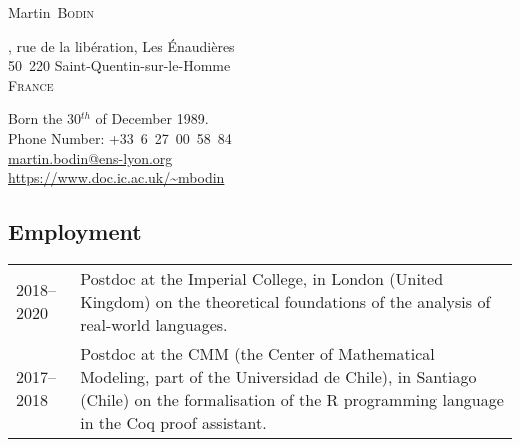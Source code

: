 \documentclass[12pt,a4paper]{article}
\makeatletter
\newcommand{\es}[1]{\foreignlanguage{spanish}{{#1}}}
\newcommand{\es}[1]{\foreignlanguage{spanish}{{#1}}}
\newenvironment{datecvsection}[1]%
               {\subsection*{#1}%
                 \noindent \begin{tabular}{@{}p{\annee}p{\texte}@{}}}
               {\end{tabular}}
\newcommand\familyName{\textsc}
\newcommand\placeName{}
\makeatother
\begin{document}
\pagestyle{empty}


\newlength{\annee}
\settowidth{\annee}{9999—9999} %


\newlength{\texte}
\setlength{\texte}{\textwidth} \addtolength{\texte}{-\annee} 
	\addtolength{\texte}{-2\tabcolsep}

\begin{center} \Huge Martin~\familyName{Bodin} \end{center}

\parbox{0.5\textwidth}
{
  , rue de la libération,
  Les Énaudières \\
  50~220 Saint-Quentin-sur-le-Homme \\
  \textsc{France}
}
\parbox{.55\textwidth}
{
\begin{flushright}
  Born the 30\(^{th}\) of December 1989. \\
  \noindent Phone Number: \mbox{+33 6 27 00 58 84} \\
  \url{martin.bodin@ens-lyon.org} \\
  \url{https://www.doc.ic.ac.uk/~mbodin}
\end{flushright}
}


\begin{datecvsection}{Employment}

    2018–2020 & Postdoc at the \placeName{Imperial College}, in \placeName{London} (\placeName{United Kingdom}) on the theoretical foundations of the analysis of real-world languages. \\

    2017–2018 & Postdoc at the {CMM} (the Center of Mathematical Modeling, part of the \es{\placeName{Universidad de Chile}}), in \placeName{Santiago} (\placeName{Chile}) on the formalisation of the R programming language in the Coq proof assistant. \\

\end{datecvsection}
\end{document}
